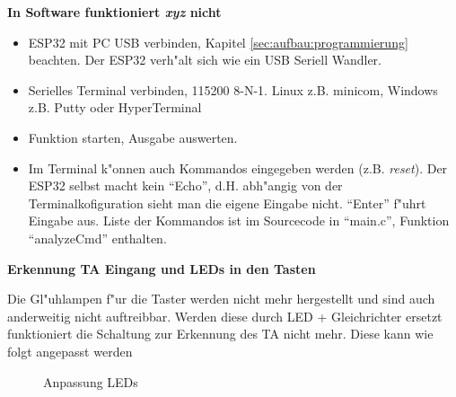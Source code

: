 \documentclass[ngerman,11pt,parskip=half] {scrartcl}
\begin{document}
\textbf{In Software funktioniert \emph{xyz} nicht}

\begin{itemize}
\item ESP32 mit PC USB verbinden, Kapitel \ref{sec:aufbau:programmierung} beachten. Der ESP32 verh"alt sich wie ein USB Seriell Wandler.
\item Serielles Terminal verbinden, 115200 8-N-1. Linux z.B. minicom, Windows z.B. Putty oder HyperTerminal
\item Funktion starten, Ausgabe auswerten. 
\item Im Terminal k"onnen auch Kommandos eingegeben werden (z.B. \emph{reset}). Der ESP32 selbst macht kein "`Echo"', d.H. abh"angig von der Terminalkofiguration sieht man die eigene Eingabe nicht. "`Enter"' f"uhrt Eingabe aus. Liste der Kommandos ist im Sourcecode in "`main.c"', Funktion "`analyzeCmd"' enthalten.
\end{itemize}

\textbf{Erkennung TA Eingang und LEDs in den Tasten}

Die Gl"uhlampen f"ur die Taster werden nicht mehr hergestellt und sind auch anderweitig nicht auftreibbar. Werden diese durch LED + Gleichrichter ersetzt funktioniert die Schaltung zur Erkennung des TA nicht mehr. Diese kann wie folgt angepasst werden

\begin{figure}[H]
\centering
{}
\hspace{1cm} %
\caption{Anpassung LEDs} \label{fig:1}
\end{figure}
\end{document}
